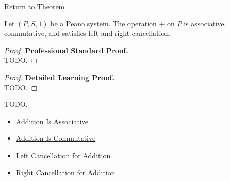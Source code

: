 \newpage
{}
\label{prf:n-additive-structure}

\begin{remark*}[Return]
\hyperref[thm:n-additive-structure]{Return to Theorem}
\end{remark*}

\begin{theorem*}
Let $(P,S,1)$ be a Peano system. The operation $+$ on $P$ is associative,
commutative, and satisfies left and right cancellation.
\end{theorem*}

\begin{proof}
\textbf{Professional Standard Proof.}~\\
TODO.
\end{proof}

\begin{proof}
\textbf{Detailed Learning Proof.}~\\
TODO.
\end{proof}

\begin{remark*}
TODO.
\end{remark*}

\begin{dependencies}
\begin{itemize}
  \item \hyperref[thm:addition-associative]{Addition Is Associative}
  \item \hyperref[thm:addition-commutative]{Addition Is Commutative}
  \item \hyperref[thm:addition-left-cancellation]{Left Cancellation for Addition}
  \item \hyperref[thm:addition-right-cancellation]{Right Cancellation for Addition}
\end{itemize}
\end{dependencies}
